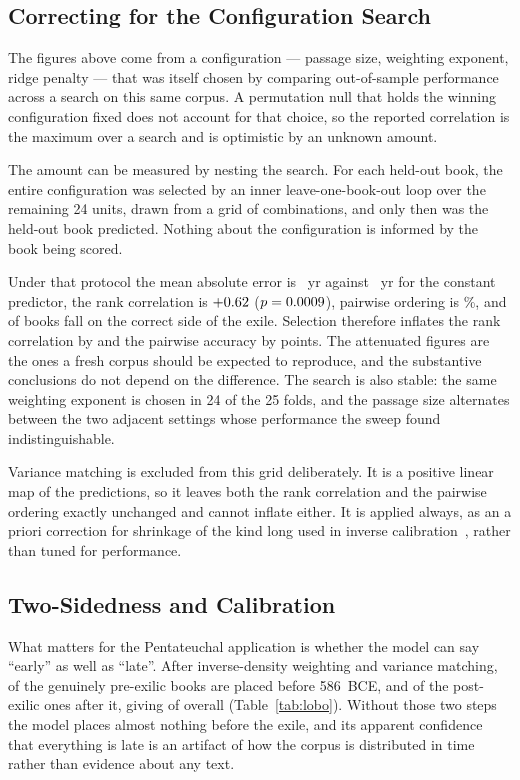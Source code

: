 \documentclass[10pt,letterpaper]{article}
\begin{document}
\subsection*{Correcting for the Configuration Search}

The figures above come from a configuration --- passage size, weighting
exponent, ridge penalty --- that was itself chosen by comparing out-of-sample
performance across a search on this same corpus.  A permutation null that holds
the winning configuration fixed does not account for that choice, so the
reported correlation is the maximum over a search and is optimistic by an
unknown amount.

The amount can be measured by nesting the search.  For each held-out book, the
entire configuration was selected by an inner leave-one-book-out loop over the
remaining 24 units, drawn from a grid of \NSgrid{} combinations, and only then
was the held-out book predicted.  Nothing about the configuration is informed by
the book being scored.

Under that protocol the mean absolute error is \NSmae~yr against \HBmaebase~yr
for the constant predictor, the rank correlation is $+0.62$ ($p = 0.0009$),
pairwise ordering is \NSpair\%, and \NSside{} of \HBbooks{} books fall on the
correct side of the exile.  Selection therefore inflates the rank correlation by
\SELinflate{} and the pairwise accuracy by \SELinflatePair{} points.  The attenuated
figures are the ones a fresh corpus should be expected to reproduce, and the
substantive conclusions do not depend on the difference.  The search is also
stable: the same weighting exponent is chosen in 24 of the 25 folds, and the
passage size alternates between the two adjacent settings whose performance the
sweep found indistinguishable.

Variance matching is excluded from this grid deliberately.  It is a positive
linear map of the predictions, so it leaves both the rank correlation and the
pairwise ordering exactly unchanged and cannot inflate either.  It is applied
always, as an a priori correction for shrinkage of the kind long used in
inverse calibration~\cite{Krutchkoff1967}, rather than tuned for performance.

\subsection*{Two-Sidedness and Calibration}

What matters for the Pentateuchal application is whether the model can say
``early'' as well as ``late''.  After inverse-density weighting and variance
matching, \HBnpreok{} of the \HBnpre{} genuinely pre-exilic books are placed
before 586~BCE, and \HBnpostok{} of the \HBnpost{} post-exilic ones after it, giving \HBsideok{} of \HBbooks{} overall (Table~\ref{tab:lobo}).
Without those two steps the model places almost nothing before the exile, and
its apparent confidence that everything is late is an artifact of how the
corpus is distributed in time rather than evidence about any text.
\end{document}
